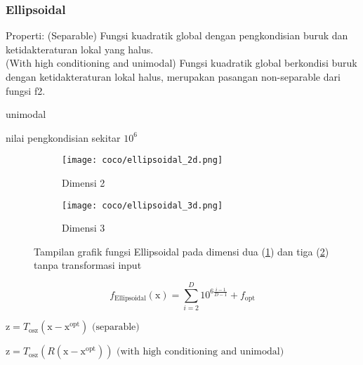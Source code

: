 \subsubsection{Ellipsoidal}
\noindent Properti:
(Separable) Fungsi kuadratik global dengan pengkondisian buruk dan ketidakteraturan lokal yang halus.\\
(With high conditioning and unimodal) Fungsi kuadratik global berkondisi buruk dengan ketidakteraturan lokal halus, merupakan pasangan non-separable dari fungsi f2.
\begin{packed_item}
  \item unimodal
  \item nilai pengkondisian sekitar $10^6$
\end{packed_item}
\begin{figure}[H]
	\centering
	\begin{subfigure}[b]{0.4\textwidth}
		\centering
		\texttt{[image: coco/ellipsoidal\_2d.png]}
		\caption{Dimensi 2}
		\label{fig:ellipsoidal_2d}
	\end{subfigure}
	\hfill
	\begin{subfigure}[b]{0.4\textwidth}
		\centering
		\texttt{[image: coco/ellipsoidal\_3d.png]}
		\caption{Dimensi 3}
		\label{fig:ellipsoidal_3d}
	\end{subfigure}
	\caption{Tampilan grafik fungsi Ellipsoidal pada dimensi dua (\cref{fig:ellipsoidal_2d}) dan tiga (\cref{fig:ellipsoidal_3d}) tanpa transformasi input}
	\label{fig:ellipsoidal}
\end{figure}
\begin{equation}
  f_{\text{Ellipsoidal}}(\mathrm{x})=\sum_{i=2}^{D}10^{6\frac{i-1}{D-1}}+f_{\text{opt}}
\end{equation}
\begin{packed_item}
    \item $\mathrm{z}=T_{\text{osz}}(\mathrm{x}-\mathrm{x}^{\text{opt}})\text{ (separable)}$\\
    \item $\mathrm{z}=T_{\text{osz}}(R(\mathrm{x}-\mathrm{x}^{\text{opt}}))\text{ (with high conditioning and unimodal)}$
\end{packed_item}

